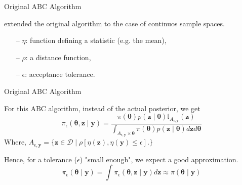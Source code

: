 \documentclass[10pt]{beamer}
\begin{document}
\begin{frame}[fragile]{Original ABC Algorithm}

  \citet{Pritchard1999} extended the original algorithm to the case
  of continuos sample spaces.

  \vspace{0.3cm}

\begin{algorithm}[H]
\SetAlgoLined
{}
 \caption{ABC method for discrete and continuous distributions}
\end{algorithm}
\begin{itemize}
  \item[--] $\eta$: function defining a statistic (e.g. the mean),
  \item[--] $\rho$: a distance function,
  \item[--] $\epsilon$: acceptance tolerance.
\end{itemize}

\end{frame}

\begin{frame}[fragile]{Original ABC Algorithm}

  For this ABC algorithm, instead of the actual posterior,
  we get
  $$
  \pi_\epsilon(\bm \theta, \bm z \mid \bm y) = 
  \frac{\pi(\bm \theta) p(\bm z \mid \bm \theta)
  \mathbb I_{A_{\epsilon,\bm y}}(\bm z)}
  {\int_{A_{\epsilon,\bm y}\times \bm\theta}\pi(\bm \theta)
  p(\bm z \mid \bm \theta)d\bm z d \bm \theta}
  $$
  Where, $A_{\epsilon,\bm y} = \{
  \bm z \in \mathcal D \mid \rho[\eta(\bm z), \eta(\bm y) \leq \epsilon].
  \}$

  Hence, for a tolerance ($\epsilon$) "small enough", we expect a good
  approximation.
  $$\pi_\epsilon(\bm \theta \mid \bm y) = 
  \int \pi_\epsilon(\bm \theta, \bm z \mid \bm y) d \bm z \approx
  \pi(\bm \theta \mid \bm y)$$

\end{frame}

\AtBeginSection{}
\end{document}
